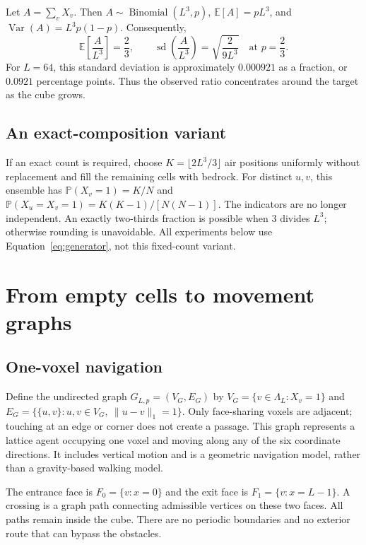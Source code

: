 \documentclass[11pt,letterpaper]{article}
\newcommand{\E}{\mathbb{E}}
\newcommand{\Prob}{\mathbb{P}}
\newcommand{\Var}{\operatorname{Var}}
\newcommand{\G}{G_{L,p}}
\begin{document}
Let $A=\sum_v X_v$. Then $A\sim\operatorname{Binomial}(L^3,p)$,
$\E[A]=pL^3$, and $\Var(A)=L^3p(1-p)$. Consequently,
\begin{equation}
 \E\!\left[\frac{A}{L^3}\right]=\frac23,
 \qquad
 \operatorname{sd}\!\left(\frac{A}{L^3}\right)
 =\sqrt{\frac{2}{9L^3}}
 \quad\text{at }p=\frac23.
 \label{eq:fluctuations}
\end{equation}
For $L=64$, this standard deviation is approximately $0.000921$ as a fraction,
or $0.0921$ percentage points. Thus the observed ratio concentrates around the
target as the cube grows.

\subsection{An exact-composition variant}
If an exact count is required, choose $K=\lfloor 2L^3/3\rfloor$ air positions
uniformly without replacement and fill the remaining cells with bedrock.
For distinct $u,v$, this ensemble has $\Prob(X_v=1)=K/N$ and
$\Prob(X_u=X_v=1)=K(K-1)/[N(N-1)]$. The indicators are no longer independent.
An exactly two-thirds fraction is possible when $3$ divides $L^3$; otherwise
rounding is unavoidable. All experiments below use
Equation~\eqref{eq:generator}, not this fixed-count variant.

\section{From empty cells to movement graphs}
\subsection{One-voxel navigation}
Define the undirected graph $\G=(V_G,E_G)$ by
$V_G=\{v\in\Lambda_L:X_v=1\}$ and
$E_G=\{\{u,v\}:u,v\in V_G,\ \lVert u-v\rVert_1=1\}$.
Only face-sharing voxels are adjacent; touching at an edge or corner does not
create a passage. This graph represents a lattice agent occupying one voxel
and moving along any of the six coordinate directions.
It includes vertical motion and is a geometric navigation model, rather than
a gravity-based walking model.

The entrance face is $F_0=\{v:x=0\}$ and the exit face is
$F_1=\{v:x=L-1\}$. A crossing is a graph path connecting admissible vertices
on these two faces. All paths remain inside the cube. There are no periodic
boundaries and no exterior route that can bypass the obstacles.
\end{document}
